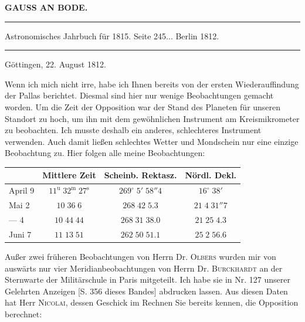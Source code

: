 \clearpage{}\hypertarget{native-362-lower}{}\label{native-362-lower}
\begin{center}\textbf{GAUSS AN BODE.}\par\vspace{4pt}\hrule\vspace{4pt}\fontsize{10}{12}\selectfont Astronomisches Jahrbuch für 1815. Seite 245\;... Berlin 1812.\par\vspace{4pt}\hrule\vspace{4pt}\end{center}

\begin{flushright}Göttingen, 22. August 1812.\end{flushright}
\par\indent Wenn ich mich nicht irre, habe ich Ihnen bereits von der ersten Wiederauffindung der Pallas berichtet. Diesmal sind hier nur wenige Beobachtungen gemacht worden. Um die Zeit der Opposition war der Stand des
Planeten für unseren Standort zu hoch, um ihn mit dem gewöhnlichen Instrument am Kreismikrometer zu beobachten. Ich musste deshalb ein anderes, schlechteres Instrument verwenden. Auch damit ließen schlechtes Wetter und Mondschein nur eine einzige Beobachtung zu. Hier folgen alle meine Beobachtungen:

\begin{center}\fontsize{10}{12}\selectfont\setlength{\tabcolsep}{4pt}\renewcommand{\arraystretch}{1.15}\begin{tabular}{l|c|c|c}
& Mittlere Zeit & Scheinb. Rektasz. & Nördl. Dekl.\\\hline
April 9 & $11^{\mathrm u}\;32^{\mathrm m}\;27^{\mathrm s}$ & $269^\circ\;5'\;58''4$ & $16^\circ\;38'$\\
Mai 2 & $10\;36\;6$ & $268\;42\;5.3$ & $21\;4\;31''7$\\
— 4 & $10\;44\;44$ & $268\;31\;38.0$ & $21\;25\;4.3$\\
Juni 7 & $11\;13\;51$ & $262\;50\;51.1$ & $25\;2\;56.6$\\
\end{tabular}\end{center}

\par\indent Außer zwei früheren Beobachtungen von Herrn Dr. \textsc{Olbers} wurden mir von auswärts nur vier Meridianbeobachtungen von Herrn Dr. \textsc{Burckhardt} an der Sternwarte der Militärschule in Paris mitgeteilt. Ich habe sie in Nr. 127 unserer Gelehrten Anzeigen [S. 356 dieses Bandes] abdrucken lassen. Aus diesen Daten hat Herr \textsc{Nicolai}, dessen Geschick im Rechnen Sie bereits kennen, die Opposition berechnet:

